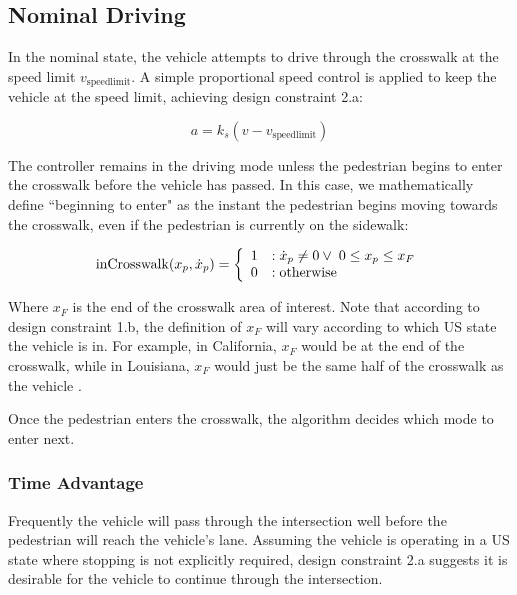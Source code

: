 \documentclass[letterpaper, 10 pt, conference]{ieeeconf}  %
\begin{document}
\subsection{Nominal Driving}
In the nominal state, the vehicle attempts to drive through the crosswalk at the speed limit $v_\mathrm{speedlimit}$. A simple proportional speed control is applied to keep the vehicle at the speed limit, achieving design constraint 2.a:

\begin{equation}
	a = k_s(v - v_\mathrm{speedlimit})
\end{equation}

The controller remains in the driving mode unless the pedestrian begins to enter the crosswalk before the vehicle has passed. In this case, we mathematically define ``beginning to enter" as the instant the pedestrian begins moving towards the crosswalk, even if the pedestrian is currently on the sidewalk:

\begin{equation}
\label{eq:crossing}
\mathrm{inCrosswalk}(x_p, 
\dot{x}_p) = \left\{
  \begin{array}{ll}
    1&: \dot{x}_p \neq 0 \vee \hspace{1 mm} 0 \leq x_p \leq x_F \\
    0&: \mathrm{otherwise} 
  \end{array}
\right.
\end{equation}

 Where $x_F$ is the end of the crosswalk area of interest. Note that according to design constraint 1.b, the definition of $x_F$ will vary according to which US state the vehicle is in. For example, in California, $x_F$ would be at the end of the crosswalk, while in Louisiana, $x_F$ would just be the same half of the crosswalk as the vehicle \cite{Legislatures2018}.  

Once the pedestrian enters the crosswalk, the algorithm decides which mode to enter next. 

\subsubsection{Time Advantage}

Frequently the vehicle will pass through the intersection well before the pedestrian will reach the vehicle's lane. Assuming the vehicle is operating in a US state where stopping is not explicitly required, design constraint 2.a suggests it is desirable for the vehicle to continue through the intersection.
\end{document}
